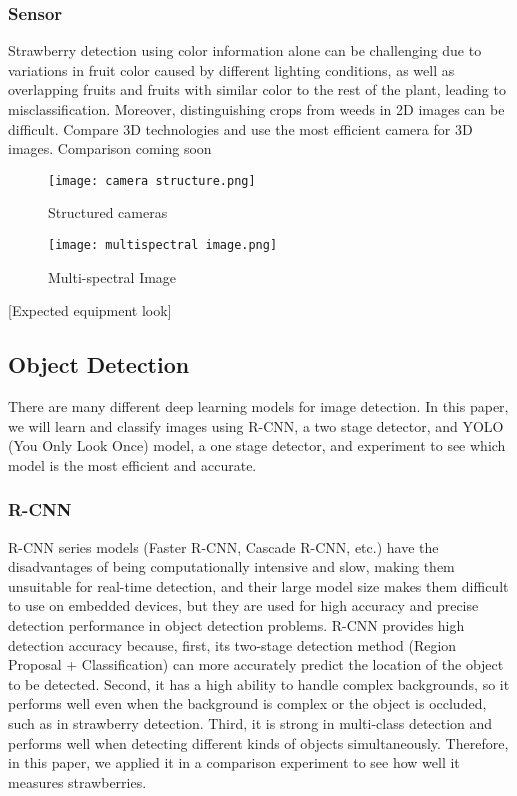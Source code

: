 \documentclass{ws-ijprai}
\begin{document}
\subsubsection{Sensor}

Strawberry detection using color information alone can be challenging due to variations in fruit color caused by different lighting conditions, as well as overlapping fruits and fruits with similar color to the rest of the plant, leading to misclassification. Moreover, distinguishing crops from weeds in 2D images can be difficult. Compare 3D technologies and use the most efficient camera for 3D images. 
Comparison coming soon


\begin{figure}
    \centering
    \texttt{[image: camera structure.png]}
    \caption{Structured cameras}
    \label{fig:enter-label}
\end{figure}
    \begin{figure}
        \centering
        \texttt{[image: multispectral image.png]}
        \caption{Multi-spectral Image}
        \label{fig:enter-label}
    \end{figure}
[Expected equipment look]







\subsection{Object Detection}

There are many different deep learning models for image detection. In this paper, we will learn and classify images using R-CNN, a two stage detector, and YOLO (You Only Look Once) model, a one stage detector, and experiment to see which model is the most efficient and accurate.


\subsubsection{R-CNN}

R-CNN series models (Faster R-CNN, Cascade R-CNN, etc.) have the disadvantages of being computationally intensive and slow, making them unsuitable for real-time detection, and their large model size makes them difficult to use on embedded devices, but they are used for high accuracy and precise detection performance in object detection problems. R-CNN provides high detection accuracy because, first, its two-stage detection method (Region Proposal + Classification) can more accurately predict the location of the object to be detected. Second, it has a high ability to handle complex backgrounds, so it performs well even when the background is complex or the object is occluded, such as in strawberry detection. Third, it is strong in multi-class detection and performs well when detecting different kinds of objects simultaneously. Therefore, in this paper, we applied it in a comparison experiment to see how well it measures strawberries. 
\end{document}
